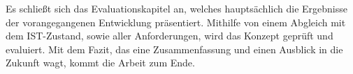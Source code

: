 Es schließt sich das Evaluationskapitel an, welches hauptsächlich die Ergebnisse der vorangegangenen Entwicklung präsentiert. Mithilfe von einem Abgleich mit dem IST-Zustand, sowie aller Anforderungen, wird das Konzept geprüft und evaluiert. Mit dem Fazit, das eine Zusammenfassung und einen Ausblick in die Zukunft wagt, kommt die Arbeit zum Ende.



